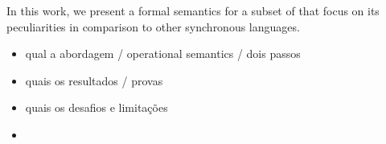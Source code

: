 In this work, we present a formal semantics for a subset of \CEU that focus on
its peculiarities in comparison to other synchronous languages.
\begin{itemize}
    \item qual a abordagem / operational semantics / dois passos
    \item quais os resultados / provas
    \item quais os desafios e limitações
    \item {}
\end{itemize}

